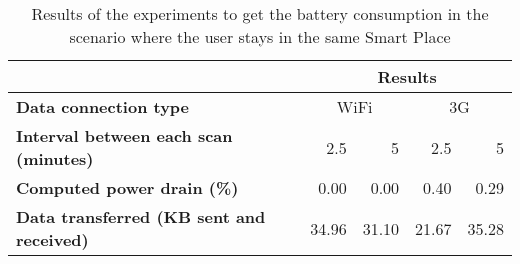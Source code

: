 \begin{table}[]
\centering
\begin{tabular}{@{}|l|r|r|r|r|@{}}
\toprule
{\bf }                                        & \multicolumn{4}{c|}{{\bf Results}}                  \\ \midrule
{\bf Data connection type}                    & \multicolumn{2}{c|}{WiFi} & \multicolumn{2}{c|}{3G} \\ \midrule
{\bf Interval between each scan (minutes)}    & 2.5          & 5          & 2.5        & 5          \\ \midrule
{\bf Computed power drain (\%)}               & 0.00         & 0.00       & 0.40       & 0.29       \\ \midrule
{\bf Data transferred (KB sent and received)} & 34.96        & 31.10      & 21.67      & 35.28      \\ \bottomrule
\end{tabular}
\caption[Power drain when the user is not moving]{Results of the experiments to get the battery consumption in the scenario where the user stays in the same Smart Place}
\label{tab:results_battery_stopped}
\end{table}
